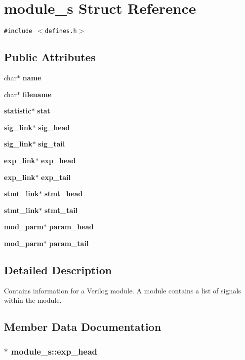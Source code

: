 \section{module\_\-s  Struct Reference}
\label{structmodule__s}
{\tt \#include $<$defines.h$>$}

\subsection*{Public Attributes}
\begin{CompactItemize}
\item 
char$\ast$ {\bf name}
\item 
char$\ast$ {\bf filename}
\item 
{\bf statistic}$\ast$ {\bf stat}
\item 
{\bf sig\_\-link}$\ast$ {\bf sig\_\-head}
\item 
{\bf sig\_\-link}$\ast$ {\bf sig\_\-tail}
\item 
{\bf exp\_\-link}$\ast$ {\bf exp\_\-head}
\item 
{\bf exp\_\-link}$\ast$ {\bf exp\_\-tail}
\item 
{\bf stmt\_\-link}$\ast$ {\bf stmt\_\-head}
\item 
{\bf stmt\_\-link}$\ast$ {\bf stmt\_\-tail}
\item 
{\bf mod\_\-parm}$\ast$ {\bf param\_\-head}
\item 
{\bf mod\_\-parm}$\ast$ {\bf param\_\-tail}
\end{CompactItemize}


\subsection{Detailed Description}
Contains information for a Verilog module. A module contains a list of signals within the module. 



\subsection{Member Data Documentation}
\subsubsection{ $\ast$ module\_\-s::exp\_\-head}\label{structmodule__s_m5}


